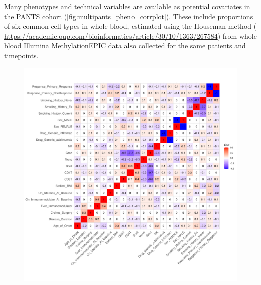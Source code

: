 \begin{outline}
Many phenotypes and technical variables are available as potential covariates in the \gls{PANTS} cohort (\autoref{fig:multipants_pheno_corrplot}).
These include proportions of six common cell types in whole blood, 
estimated using the Houseman method ( \url{https://academic.oup.com/bioinformatics/article/30/10/1363/267584}) 
from whole blood Illumina MethylationEPIC data also collected for the same patients and timepoints.

\begin{figure}
    \centering
    \includegraphics[width=1.0\textwidth,page=1]{mainmatter/figures/chapter_05/process_pheno.pheno_filtered_dge.ggcorrplot.pdf}
    \caption{}
    \label{fig:multipants_pheno_corrplot}
\end{figure}


\end{outline}
